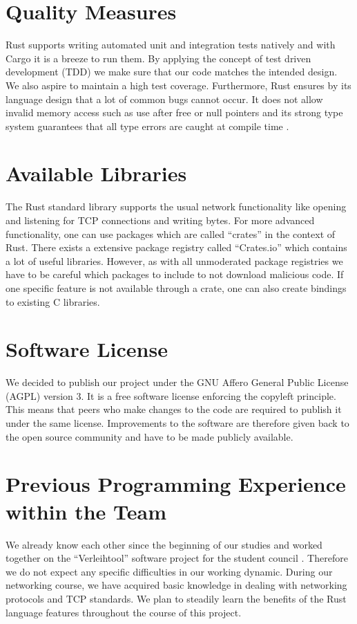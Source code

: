 \documentclass[a4paper, 11pt]{article}
\begin{document}
\section*{Quality Measures}
Rust supports writing automated unit and integration tests natively and with Cargo it is a breeze to run them. By applying the concept of test driven development (TDD) we make sure that our code matches the intended design. We also aspire to maintain a high test coverage.
Furthermore, Rust ensures by its language design that a lot of common bugs cannot occur. It does not allow invalid memory access such as use after free or null pointers and its strong type system guarantees that all type errors are caught at compile time \cite{RustBook}.

\section*{Available Libraries}
The Rust standard library supports the usual network functionality like opening and listening for TCP connections and writing bytes. For more advanced functionality, one can use packages which are called ``crates'' in the context of Rust.
There exists a extensive package registry called ``Crates.io'' \cite{Crates} which contains a lot of useful libraries. However, as with all unmoderated package registries we have to be careful which packages to include to not download malicious code. If one specific feature is not available through a crate, one can also create bindings to existing C libraries.

\section*{Software License}
We decided to publish our project under the GNU Affero General Public License (AGPL)  \cite{AGPL} version 3. It is a free software license enforcing the copyleft principle. This means that peers who make changes to the code are required to publish it under the same license. Improvements to the software are therefore given back to the open source community and have to be made publicly available.

\section*{Previous Programming Experience within the Team}
We already know each other since the beginning of our studies and worked together on the ``Verleihtool'' software project for the student council  \cite{verleihtool}. Therefore we do not expect any specific difficulties in our working dynamic.
During our networking course, we have acquired basic knowledge in dealing with networking protocols and TCP standards. We plan to steadily learn the benefits of the Rust language features throughout the course of this project.
\end{document}
